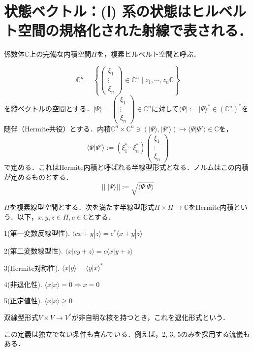 \documentclass[uplatex, dvipdfmx]{jsreport}
\begin{document}
\section{状態ベクトル：(Ⅰ) 系の状態はヒルベルト空間の規格化された射線で表される．}

\begin{definition}[複素Hilbert空間]
    係数体$\mathbb{C}$上の完備な内積空間$H$を，複素ヒルベルト空間と呼ぶ．
\end{definition}
\begin{example}[ベクトルの空間としての複素Hilbert空間]
    \[\mathbb{C}^n=\left\{\left(\begin{array}{c}\xi_1 \\ \vdots \\ \xi_n\end{array}\right)\in\mathbb{C}^n\mid z_1,\cdots,z_n\mathbb{C}\right\}\]
    を縦ベクトルの空間とする．$|\Psi\rangle=\left(\begin{array}{c}\xi_1 \\ \vdots \\ \xi_n\end{array}\right)\in\mathbb{C}^n$に対して$\langle\Psi|:=|\Psi\rangle^*\in(\mathbb{C}^n)^*$を随伴（Hermite共役）とする．内積$\mathbb{C}^n\times\mathbb{C}^n\ni (|\Psi\rangle, |\Psi'\rangle)\mapsto\langle\Psi|\Psi'\rangle\in\mathbb{C}$を，
    \[ \langle\Psi |\Psi'\rangle := (\xi_1^* \cdots \xi_n^* )\left(\begin{array}{c}\xi_1 \\ \vdots \\ \xi_n\end{array}\right) \]
    で定める．これはHermite内積と呼ばれる半線型形式となる．ノルムはこの内積が定めるものとする．
    \[ ||\;|\Psi\rangle ||:=\sqrt{\langle\Psi|\Psi\rangle} \]
\end{example}
\begin{definition}[Hermite内積]$H$を複素線型空間とする．次を満たす半線型形式$H\times H\to\mathbb{C}$をHermite内積という．以下，$x,y,z\in H, c\in\mathbb{C}$とする．
    
    1(第一変数反線型性). $\langle cx+y|z\rangle = c^*\langle x+y|z\rangle$

    2(第二変数線型性). $\langle x|cy+z\rangle = c\langle x|y+z\rangle$

    3(Hermite対称性). $\langle x|y\rangle = \langle y|x\rangle^*$

    4(非退化性). $\langle x|x\rangle=0\Rightarrow x=0$

    5(正定値性). $\langle x|x\rangle\ge0$
\end{definition}
\begin{remark}
    双線型形式$V\times V\to V^*$が非自明な核を持つとき，これを退化形式という．

    この定義は独立でない条件も含んでいる．例えば，2, 3, 5のみを採用する流儀もある．
\end{remark}
\end{document}
